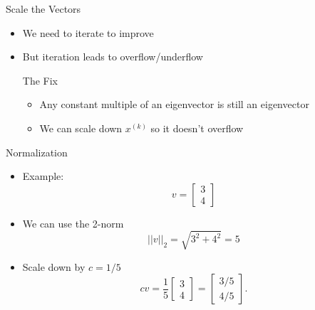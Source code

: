 \documentclass[10pt]{beamer}
\begin{document}
\begin{frame}{Scale the Vectors}


    \begin{itemize}
        \item We need to iterate to improve
            \vfill 
        \item But iteration leads to overflow/underflow
            \vfill 
        
    
    \begin{block}{The Fix}
    \begin{itemize}
        \item Any constant multiple of an eigenvector is still an eigenvector 
            
        \item We can scale down \( x^{(k)} \) so it doesn't overflow
    \end{itemize}
    \end{block}
    \end{itemize}
    
\end{frame}
\begin{frame}{Normalization}


\begin{itemize}
    \item Example: 
    $$
        v = \begin{bmatrix}
            3\\4
        \end{bmatrix}
    $$
    \item We can use the 2-norm 
    $$
    ||v||_2 = \sqrt{3^2+4^2} = 5
    $$

    \item Scale down by $c=1/5$
    $$
    cv = \frac{1}{5} \begin{bmatrix}
        3\\4
    \end{bmatrix} = \begin{bmatrix}
        3/5\\4/5
    \end{bmatrix}. 
    $$
\end{itemize}
    
\end{frame}

\end{document}
